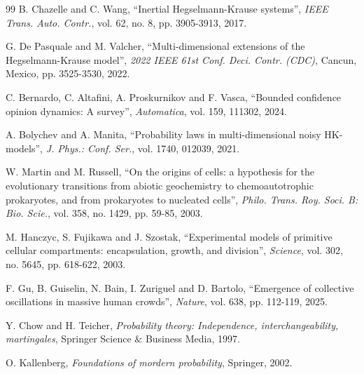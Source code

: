 \documentclass[11pt]{article}
\theoremstyle{definition}
\theoremstyle{remark}
\numberwithin{equation}{section}
\begin{document}
\begin{thebibliography}{99}
B. Chazelle and C. Wang, ``Inertial Hegselmann-Krause systems'', \emph{IEEE Trans. Auto. Contr.}, vol. 62, no. 8, pp. 3905-3913, 2017.

G. De Pasquale and M. Valcher, ``Multi-dimensional extensions of the Hegselmann-Krause model'', \emph{2022 IEEE 61st Conf. Deci. Contr. (CDC)}, Cancun, Mexico, pp. 3525-3530, 2022.

C. Bernardo, C. Altafini, A. Proskurnikov and F. Vasca, ``Bounded confidence opinion dynamics: A survey'', \emph{Automatica}, vol. 159, 111302, 2024.

A. Bolychev and A. Manita, ``Probability laws in multi-dimensional noisy HK-models'', \emph{J. Phys.: Conf. Ser.}, vol. 1740, 012039, 2021.

W. Martin and M. Russell, ``On the origins of cells: a hypothesis for the evolutionary transitions from abiotic geochemistry to chemoautotrophic prokaryotes, and from prokaryotes to nucleated cells'', \emph{Philo. Trans. Roy. Soci. B: Bio. Scie.}, vol. 358, no. 1429, pp. 59-85, 2003.

M. Hanczyc, S. Fujikawa and J. Szostak, ``Experimental models of primitive cellular compartments: encapsulation, growth, and division'', \emph{Science}, vol. 302, no. 5645, pp. 618-622, 2003.

F. Gu, B. Guiselin, N. Bain, I. Zuriguel and D. Bartolo, ``Emergence of collective oscillations in massive human crowds'', \emph{Nature}, vol. 638, pp. 112-119, 2025.

Y. Chow and H. Teicher, \emph{Probability theory: Independence, interchangeability, martingales}, Springer Science $\&$ Business Media, 1997.

O. Kallenberg, \emph{Foundations of mordern probability}, Springer, 2002.
%
\end{thebibliography}
\end{document}
